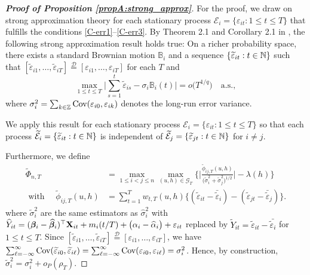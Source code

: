 \documentclass[a4paper,12pt]{article}
\begin{document}
\begin{proof}[\textnormal{\textbf{Proof of Proposition \ref{propA:strong_approx}}}] 
For the proof, we draw on strong approximation theory for each stationary process $\mathcal{E}_i = \{\varepsilon_{it}: 1 \leq t \leq T\}$ that fulfills the conditions \ref{C-err1}--\ref{C-err3}. By Theorem 2.1 and Corollary 2.1 in \cite{BerkesLiuWu2014}, the following strong approximation result holds true: On a richer probability space, there exists a standard Brownian motion $\mathbb{B}_i$ and a sequence $\{ \widetilde{\varepsilon}_{it}: t \in \mathbb{N} \}$ such that $[\widetilde{\varepsilon}_{i1},\ldots,\widetilde{\varepsilon}_{iT}] \stackrel{\mathcal{D}}{=} [\varepsilon_{i1},\ldots,\varepsilon_{iT}]$ for each $T$ and 
\begin{equation}\label{eq-strongapprox-dep}
\max_{1 \le t \le T} \Big| \sum\limits_{s=1}^t \widetilde{\varepsilon}_{is} - \sigma_i \mathbb{B}_i(t) \Big| = o\big( T^{1/q} \big) \quad \text{a.s.},  
\end{equation}
where $\sigma^2_i = \sum_{k \in \mathbb{Z}} \textnormal{Cov}(\varepsilon_{i0}, \varepsilon_{ik})$ denotes the long-run error variance.

We apply this result for each stationary process $\mathcal{E}_i = \{\varepsilon_{it}: 1 \leq t \leq T\}$ so that each process $\widetilde{\mathcal{E}}_i = \{\widetilde{\varepsilon}_{it}: t\in \mathbb{N}\}$ is independent of $\widetilde{\mathcal{E}}_j= \{\widetilde{\varepsilon}_{jt}: t\in \mathbb{N}\}$ for $i \neq j$.

Furthermore, we define 
\begin{align*}
\widetilde{\Phi}_{n,T} &= \max_{1 \le i < j \le n}\max_{(u,h) \in \mathcal{G}_T} \Bigg\{ \bigg|\frac{\widetilde{\phi}_{ij, T}(u,h)}{\big(\widetilde{\sigma}_i^2 + \widetilde{\sigma}_j^2 \big)^{1/2}} \bigg| - \lambda(h)\Bigg\}\\
\text{ with }\quad \widetilde{\phi}_{ij, T}(u,h) &= \sum\nolimits_{t=1}^T w_{t,T}(u,h) \big\{ (\widetilde{\varepsilon}_{it} - \bar{\widetilde{\varepsilon}}_i)  - (\widetilde{\varepsilon}_{jt} - \bar{\widetilde{\varepsilon}}_j)\big\}.
\end{align*}
where $\widetilde{\sigma}^2_i$ are the same estimators as $\widehat{\sigma}^2_i$ with $\widehat{Y}_{it} = (\bm{\beta}_i - \widehat{\bm{\beta}}_i)^\top \mathbf{X}_{it} + m_i ( t/T) + \big( \alpha_i - \widehat{\alpha}_i \big) + \varepsilon_{it}$
replaced by \textcolor{black}{$\widetilde{Y}_{it} =\widetilde{\varepsilon}_{it} - \bar{\widetilde{\varepsilon}_{i}}$}  for $1 \le t \le T$. Since $[\widetilde{\varepsilon}_{i1},\ldots,\widetilde{\varepsilon}_{iT}] \stackrel{\mathcal{D}}{=} [\varepsilon_{i1},\ldots,\varepsilon_{iT}]$, we have $\sum\nolimits_{\ell=-\infty}^{\infty} \textnormal{Cov}(\widetilde{\varepsilon}_{i0}, \widetilde{\varepsilon}_{i\ell})  = \sum\nolimits_{\ell=-\infty}^{\infty} \textnormal{Cov}(\varepsilon_{i0}, \varepsilon_{i\ell})= \sigma_i^2$. Hence, by construction, \linebreak $\widetilde{\sigma}_i^2 = \sigma_i^2 + o_P(\rho_T)$.


\end{proof}
\end{document}
